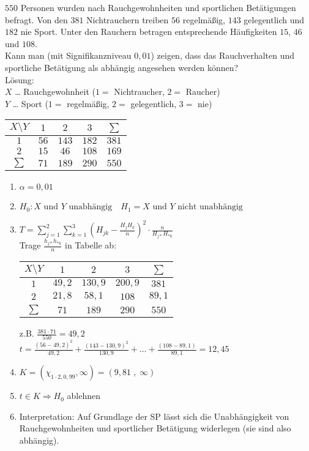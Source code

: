  $550$ Personen wurden nach Rauchgewohnheiten und sportlichen Betätigungen befragt. Von den $381$ Nichtrauchern treiben $56$ regelmäßig, $143$ gelegentlich und $182$ nie Sport. Unter den Rauchern betragen entsprechende Häufigkeiten $15$, $46$ und $108$.\\
Kann man (mit Signifikanzniveau $0,01$) zeigen, dass das Rauchverhalten und sportliche Betätigung als abhängig angesehen werden können?\\
Lösung:\\
$X$ … Rauchgewohnheit ($1=$ Nichtraucher, $2=$ Raucher)\\
$Y$ … Sport ($1=$ regelmäßig, $2=$ gelegentlich, $3=$ nie)\\
\begin{tabular}{c | c c c | c}
$X\setminus Y$ & $1$ & $2$ & $3$ & $\sum$\\\hline
$1$ & $56$ & $143$ & $182$ & $381$\\
$2$ & $15$ & $46$ & $108$ & $169$\\\hline
$\sum$& $71$ & $189$ & $290$ & $550$
\end{tabular}
\begin{enumerate}
\item $\alpha = 0,01$
\item $H_0: X\text{ und }Y\text{ unabhängig} \quad H_1=X \text{ und }Y \text{ nicht unabhängig}$
\item $T=\sum_{j=1}^2 \sum_{k=1}^3 \left(H_{jk}-\frac{H_j H_k}{n}\right)^2 \cdot \frac{n}{H_{j*}H_{*k}}$\\
Trage $\frac{h_{j*}h_{*k}}{n}$ in Tabelle ab:\\
\begin{tabular}{c | c c c | c}
$X\setminus Y$ & $1$ & $2$ & $3$ & $\sum$\\\hline
$1$ & $49,2$ & $130,9$ & $200,9$ & $381$\\
$2$ & $21,8$ & $58,1$ & $108$ & $89,1$\\\hline
$\sum$& $71$ & $189$ & $290$ & $550$
\end{tabular} z.B. $\frac{381\cdot 71}{550}=49,2$\\
$t=\frac{(56-49,2)^2}{49,2}+\frac{(143-130,9)^2}{130,9}+\ldots + \frac{(108-89,1)}{89,1}=12,45$
\item $K=(\chi_{1\cdot 2, 0,99},\infty) = (9,81\;,\; \infty)$
\item $t\in K \Rightarrow H_0 $ ablehnen
\item Interpretation: Auf Grundlage der SP lässt sich die Unabhängigkeit von Rauchgewohnheiten und sportlicher Betätigung widerlegen (sie sind also abhängig).
\end{enumerate}



